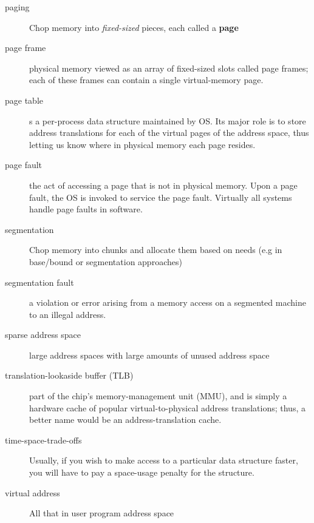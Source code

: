\begin{description}
\item[paging] Chop memory into \emph{fixed-sized} pieces, each called a \textbf{page}

\item[page frame] physical memory viewed as an array of fixed-sized slots called page frames; each of these frames can contain a single virtual-memory page.

\item[page table] s a per-process data structure maintained by OS.  Its major role is to store address translations for each of the virtual pages of the address space, thus letting us know where in physical memory each page resides.

\item[page fault] the act of accessing a page that is not in physical memory.  Upon a page fault, the OS is invoked to service the page fault.  Virtually all systems handle page faults in software.

\item[segmentation] Chop memory into  chunks and allocate them based on needs (e.g in base/bound or segmentation approaches)

\item[segmentation fault] a violation or error arising from a memory access on a segmented machine to an illegal address.

\item[sparse address space] large address spaces with large amounts of unused address space

\item[translation-lookaside buffer (TLB)] part of the chip’s memory-management unit (MMU), and is simply a hardware cache of popular virtual-to-physical address translations; thus, a better name would be an address-translation cache.

\item[time-space-trade-offs] Usually, if you wish to make access to a particular data structure faster, you will have to pay a space-usage penalty for the structure.

\item[virtual address] All that in user program address space



\end{description}

